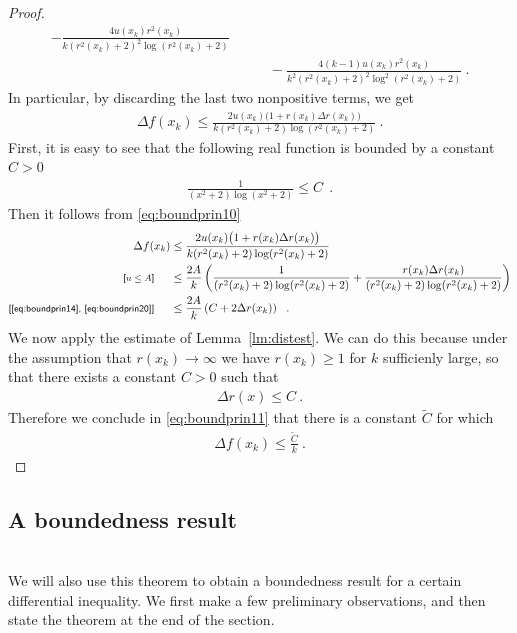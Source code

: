 \documentclass[a4paper,11pt,openright,twoside]{book}
\newcommand{\1}{\mathds{1}}
\newcommand{\commb}[1]{\textsf{{\footnotesize[#1]}}}
\theoremstyle{plain}
\theoremstyle{definition}
\theoremstyle{remark}
\begin{document}
\begin{proof}
\begin{align*}
		-
		\frac{4u(x_k)r^2(x_k)}{k(r^2(x_k)+2)^2\log(r^2(x_k)+2)}\\
		&\qquad
		-
		\frac{4(k-1)u(x_k)r^2(x_k)}{k^2(r^2(x_k)+2)^2\log^2(r^2(x_k)+2)}
		\ .
	\end{align*}
	In particular, by discarding the last two nonpositive terms, we get
	\begin{align}\label{eq:boundprin10}
		\Delta f(x_k)
		\le
		\frac{2u(x_k)\bigl(1+r(x_k)\Delta r(x_k)\bigr)}{k(r^2(x_k)+2)\log(r^2(x_k)+2)}
		\ .
	\end{align}
	First, it is easy to see that the following real function is bounded by a constant $C>0$
	\begin{align}\label{eq:boundprin20}
		\frac{1}{(x^2+2)\log(x^2+2)} \leq C
	\ \ . 
	\end{align}
	Then it follows from \eqref{eq:boundprin10}
	\begin{align}
		\Delta f(x_k) 
		&\leq \frac{2u(x_k)\bigl(1+r(x_k)\Delta r(x_k)\bigr)}{k(r^2(x_k)+2)\log(r^2(x_k)+2)}\notag \\
		\commb{$u\leq A$}\hspace*{5mm}&\leq\frac{2A}{k} \left( \frac{1}{(r^2(x_k)+2)\log(r^2(x_k)+2)} + \frac{r(x_k)\Delta r(x_k)}{(r^2(x_k)+2)\log(r^2(x_k)+2)}\right)\notag\\
		\commb{\eqref{eq:boundprin14}, \eqref{eq:boundprin20}}\hspace*{5mm}&\leq \frac{2A}{k} \left( C +2\Delta r(x_k)   \right) \label{eq:boundprin11}
	\ \ .
	\end{align}
	We now apply the estimate of Lemma~\ref{lm:distest}. We can do this because under the assumption that $r(x_k)\to\infty$ we have $r(x_k)\geq 1$ for $k$ sufficienly large, so that there exists a constant $C>0$ such that
	\begin{align*}
		\Delta r(x)\leq C
		\ .
	\end{align*}
	Therefore we conclude in \eqref{eq:boundprin11} that there is a constant $\tilde C$ for which
	\begin{align*}
		\Delta f(x_k)\leq \frac{\tilde C}{k}
		\ .
	\end{align*}

\end{proof}

\subsection{A boundedness result}\mbox{}\\
We will also use this theorem to obtain a boundedness result for a certain differential inequality. We first make a few preliminary observations, and then state the theorem at the end of the section.\\
\end{document}
